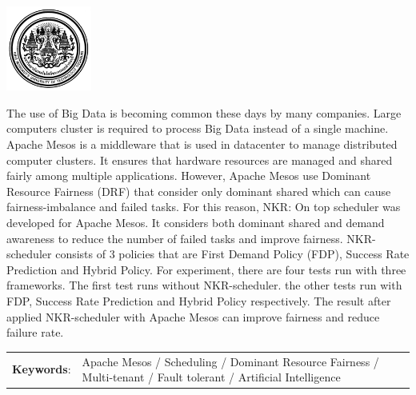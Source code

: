 \documentclass[12pt,oneside,openright,a4paper]{cpe-english-project}
\begin{document}
\pdfstringdefDisableCommands{%
\let\MakeUppercase\relax
}
\begin{center}
  \includegraphics[width=2.8cm]{logo02.jpg}
\end{center}
\vspace*{-1cm}

\maketitlepage
\makesignaturepage 

\abstract

\hspace{10mm}The use of Big Data is becoming common these days by many companies. Large computers cluster is required to process Big Data instead of a single machine. Apache Mesos is a middleware that is used in datacenter to manage distributed computer clusters. It ensures that hardware resources are managed and shared fairly among multiple applications. However, Apache Mesos use Dominant Resource Fairness (DRF) that consider only dominant shared which can cause fairness-imbalance and failed tasks. For this reason, NKR: On top scheduler was developed for Apache Mesos. It considers both dominant shared and demand awareness to reduce the number of failed tasks and improve fairness. NKR-scheduler consists of 3 policies that are First Demand Policy (FDP), Success Rate Prediction and Hybrid Policy. For experiment, there are four tests run with three frameworks. The first test runs without NKR-scheduler. the other tests run with FDP, Success Rate Prediction and Hybrid Policy respectively. The result after applied NKR-scheduler with Apache Mesos can improve fairness and reduce failure rate.

\begin{flushleft}
\begin{tabular*}{\textwidth}{@{}lp{}}
\textbf{Keywords}: & Apache Mesos / Scheduling / Dominant Resource Fairness / Multi-tenant / Fault tolerant / Artificial Intelligence 
\end{tabular*}
\end{flushleft}
\endabstract
\end{document}
